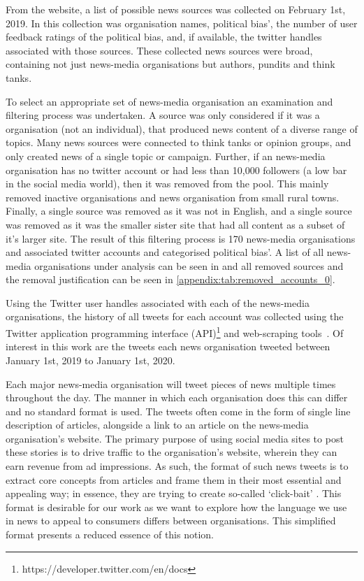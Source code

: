 From the website, a list of possible news sources was collected on February 1st, 2019. In this collection was organisation names, political bias', the number of user feedback ratings of the political bias, and, if available, the twitter handles associated with those sources. These collected news sources were broad, containing not just news-media organisations but authors, pundits and think tanks. 

To select an appropriate set of news-media organisation an examination and filtering process was undertaken. A source was only considered if it was a organisation (not an individual), that produced news content of a diverse range of topics. Many news sources were connected to think tanks or opinion groups, and only created news of a single topic or campaign. Further, if an news-media organisation has no twitter account or had less than 10,000 followers (a low bar in the social media world), then it was removed from the pool. This mainly removed inactive organisations and news organisation from small rural towns. Finally, a single source was removed as it was not in English, and a single source was removed as it was the smaller sister site that had all content as a subset of it's larger site.  The result of this filtering process is 170 news-media organisations and associated twitter accounts and categorised political bias'.  A list of all news-media organisations under analysis can be seen in \cite{app:accounts} and all removed sources and the removal justification can be seen in \autoref{appendix:tab:removed_accounts_0}.


Using the Twitter user handles associated with each of the news-media organisations, the history of all tweets for each account was collected using the Twitter application programming interface (API)\footnote{https://developer.twitter.com/en/docs} and web-scraping tools~. Of interest in this work are the tweets each news organisation tweeted between January 1st, 2019 to January 1st, 2020. 

Each major news-media organisation will tweet pieces of news multiple times throughout the day. The manner in which each organisation does this can differ and no standard format is used. The tweets often come in the form of single line description of articles, alongside a link to an article on the news-media organisation's website. The primary purpose of using social media sites to post these stories is to drive traffic to the organisation's website, wherein they can earn revenue from ad impressions. As such, the format of such news tweets is to extract core concepts from articles and frame them in their most essential and appealing way; in essence, they are trying to create so-called `click-bait' . This format is desirable for our work as we want to explore how the language we use in news to appeal to consumers differs between organisations. This simplified format presents a reduced essence of this notion.

